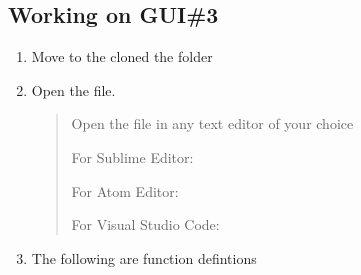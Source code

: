 \documentclass[letterpaper,10pt,english]{sphinxmanual}
\begin{document}
\subsection{Working on GUI\#3}
\label{\detokenize{developer:working-on-gui-3}}\begin{enumerate}
%
\item {} 
Move to the cloned the folder
\begin{quote}

\begin{sphinxVerbatim}[commandchars=\\\{\}]
 
\end{sphinxVerbatim}
\end{quote}

\item {} 
Open the  file.
\begin{quote}

Open the  file in any text editor of your choice

For Sublime Editor:

\begin{sphinxVerbatim}[commandchars=\\\{\}]
 
\end{sphinxVerbatim}

For Atom Editor:

\begin{sphinxVerbatim}[commandchars=\\\{\}]
 
\end{sphinxVerbatim}

For Visual Studio Code:

\begin{sphinxVerbatim}[commandchars=\\\{\}]
 
\end{sphinxVerbatim}
\end{quote}

\item {} 
The following are function defintions

\end{enumerate}
\end{document}
